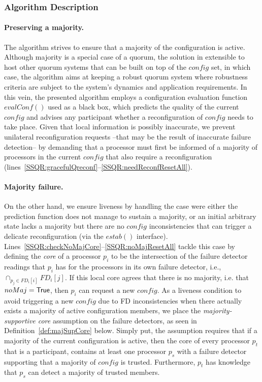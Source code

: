 \documentclass[11pt]{article}
\newcommand{\configEstab}{estab}
\begin{document}
\subsubsection{Algorithm Description}
\paragraph{Preserving a majority.}
The algorithm strives to ensure that a majority of the configuration is active. Although majority is a special case of a quorum, the solution in extensible to host other quorum systems that can be built on top of the $config$ set, in which case, the algorithm aims at keeping a robust quorum system where robustness criteria are subject to the system's dynamics and application requirements. 
In this vein, the presented algorithm employs a configuration evaluation function $evalConf()$ used as a black box, which predicts the quality of the current $config$ and advises any participant whether a reconfiguration of $config$ needs to take place.
Given that local information is possibly inaccurate, we prevent unilateral reconfiguration requests --that may be the result of inaccurate failure detection-- by demanding that a processor must first be informed of a majority of processors in the current $config$ that also require a reconfiguration (lines~\ref{SSQR:gracefulQreconf}--\ref{SSQR:needReconfResetAll}). 

\paragraph{Majority failure.}
On the other hand, we ensure liveness by handling the case were either the prediction function does not manage to sustain a majority, or an initial arbitrary state lacks a majority but there are no $config$ inconsistencies that can trigger a delicate reconfiguration (via the $\configEstab()$ interface).
Lines~\ref{SSQR:checkNoMajCore}--\ref{SSQR:noMajResetAll} tackle this case by defining the \emph{core} of a processor $p_i$ to be the intersection of the failure detector readings that $p_i$ has for the processors in its own failure detector, i.e., $\cap_{p_j \in FD_i[i]}FD_i[j]$.
If this local core agrees that there is no majority, i.e. that $noMaj= {\sf True}$, then $p_i$ can request a new $config$.
As a liveness condition to avoid triggering a new $config$ due to FD inconsistencies when there actually exists a majority of active configuration members, we place the \emph{majority-supportive core} assumption on the failure detectors, as seen in Definition~\ref{def:majSupCore} below.
Simply put, the assumption requires that if a majority of the current configuration is active, then the core of every processor $p_t$ that is a participant, contains at least one processor $p_s$ with a failure detector supporting that a majority of $config$ is trusted.
Furthermore, $p_t$ has knowledge that $p_s$ can detect a majority of trusted members.
\end{document}
